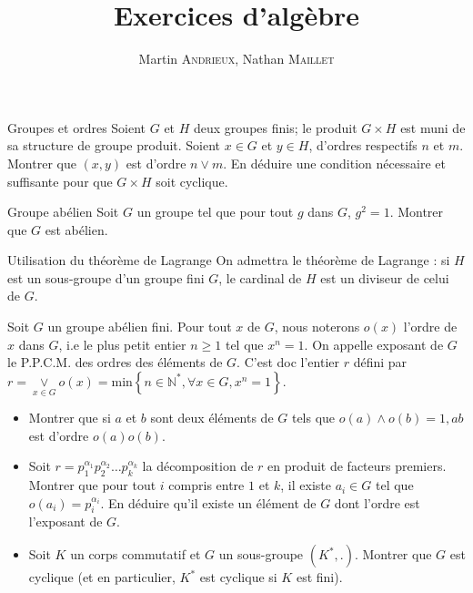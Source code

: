 \documentclass[french, a4paper, 11pt]{article}
\title{Exercices d'algèbre}
\author{Martin \textsc{Andrieux}, Nathan \textsc{Maillet}}
\date{}
\newcommand{\N}{\mathbb{N}}   %
\begin{document}
\maketitle

\begin{cadre}{Groupes et ordres}
  Soient \(G\) et \(H\) deux groupes finis; le produit \(G\times H\) est muni de sa structure de groupe produit.
  Soient \(x\in G\) et \(y\in H\), d'ordres respectifs \(n\) et \(m\). Montrer que \((x,y)\) est d'ordre \(n\vee m\).
  En déduire une condition nécessaire et suffisante pour que \(G\times H\) soit cyclique.
\end{cadre}

\begin{cadre}{Groupe abélien}
  Soit \(G\) un groupe tel que pour tout \(g\) dans \(G\), \(g^{2} = 1\). Montrer que \(G\) est abélien.
\end{cadre}

\begin{cadre}{Utilisation du théorème de Lagrange}
    On admettra le théorème de Lagrange : si $H$ est un sous-groupe d'un groupe fini $G$, le cardinal de $H$ est un diviseur
    de celui de $G$.
    
    
    Soit $G$ un groupe abélien fini. Pour tout $x$ de $G$, nous noterons $o(x)$ l'ordre de $x$ dans $G$, i.e le plus petit
    entier $n \geq 1$ tel que $x^n=1$. On appelle exposant de $G$ le P.P.C.M. des ordres des éléments de $G$. C'est doc
    l'entier $r$ défini par \(r=\underset{x \in G}{\vee} o(x)=\text{min}\left\{n \in \N^*, \forall x \in G, x^n=1\right\}\).
    \begin{itemize}[label=$\bullet$]
        \item Montrer que si $a$ et $b$ sont deux éléments de $G$ tels que \(o(a) \wedge o(b)=1, ab\) est d'ordre \(o(a)o(b)\).
        \item Soit \(r=p_1^{\alpha_1}p_2^{\alpha_2} \ldots p_k^{\alpha_k}\) la décomposition de $r$ en produit de facteurs premiers.
        Montrer que pour tout $i$ compris entre $1$ et $k$, il existe $a_i \in G$ tel que \(o(a_i)=p_i^{\alpha_i}\).
        En déduire qu'il existe un élément de $G$ dont l'ordre est l'exposant de $G$.    
        \item Soit $K$ un corps commutatif et $G$ un sous-groupe \((K^*,.)\). Montrer que $G$ est cyclique
        (et en particulier, $K^*$ est cyclique si $K$ est fini). 
    \end{itemize}   
\end{cadre}
\end{document}

